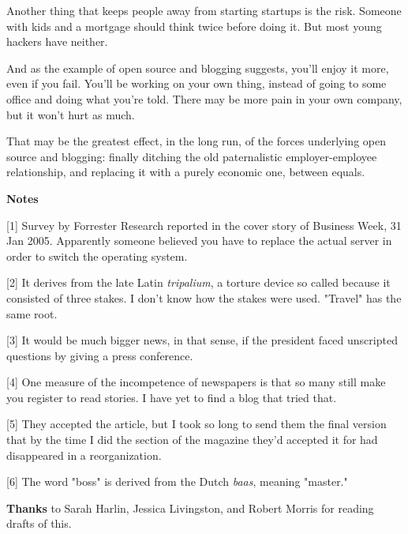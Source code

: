 Another thing that keeps people
                  away from starting startups is the risk. Someone with kids and
                  a mortgage should think twice before doing it. But most young
                  hackers have neither.

And as the example of open
                  source and blogging suggests, you'll enjoy it more, even if
                  you fail. You'll be working on your own thing, instead of
                  going to some office and doing what you're told. There may be
                  more pain in your own company, but it won't hurt as much.

That
                  may be the greatest effect, in the long run, of the forces
                  underlying open source and blogging: finally ditching the old
                  paternalistic employer-employee relationship, and replacing it
                  with a purely economic one, between equals.




                  \textbf{Notes}

[1] Survey by Forrester Research reported in the cover story of
                  Business Week, 31 Jan 2005. Apparently someone believed you
                  have to replace the actual server in order to switch the
                  operating system.

[2] It derives from the late Latin \emph{tripalium}, a torture
                  device so called because it consisted of three stakes. I don't
                  know how the stakes were used. "Travel" has the same root.

[3] It would be much bigger news, in that sense, if the
                  president faced unscripted questions by giving a press
                  conference.

[4] One measure of the incompetence of newspapers is that so
                  many still make you register to read stories. I have yet to
                  find a blog that tried that.

[5] They accepted the article, but I took so long to send them
                  the final version that by the time I did the section of the
                  magazine they'd accepted it for had disappeared in a
                  reorganization.

[6] The word "boss" is derived from the Dutch \emph{baas},
                  meaning "master."

\textbf{Thanks} to Sarah Harlin,
                  Jessica Livingston, and Robert Morris for reading drafts of
                  this.


              
            
          
